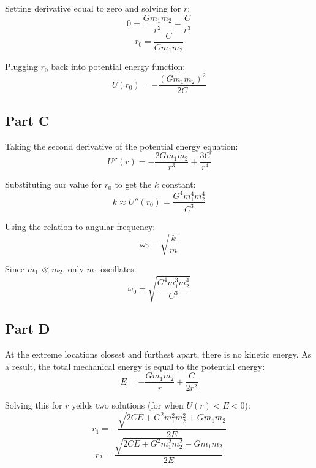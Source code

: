 \documentclass{article}
\begin{document}
Setting derivative equal to zero and solving for $r$:
$$ 0 = \frac{ G m_{1} m_{2} }{ r^{2} } - \frac{ C }{ r^{3} }  $$
$$ r_{0} = \frac{ C }{ G m_{1} m_{2} } $$

Plugging $r_{0}$ back into potential energy function:
$$ U( r_{0} ) = -\frac{ ( G m_{1} m_{2} )^{2} }{ 2 C } $$

\subsection*{ Part C }

Taking the second derivative of the potential energy equation:
$$ U''( r ) = -\frac{ 2 G m_{1} m_{2} }{ r^{3} } + \frac{ 3 C }{ r^{4} } $$

Substituting our value for $r_{0}$ to get the $k$ constant:
$$ k \approx U''( r_{0} ) = \frac{ G^{4} m_{1}^{4} m_{2}^{4} }{ C^{3} } $$

Using the relation to angular frequency:
$$ \omega_{0} = \sqrt{  \frac{ k }{ m } } $$

Since $m_{1} \ll m_{2}$, only $m_{1}$ oscillates:
$$ \omega_{0} = \sqrt{ \frac{ G^{4} m_{1}^{3} m_{2}^{4} }{ C^{3} } } $$

\subsection*{ Part D }

At the extreme locations closest and furthest apart, there is no kinetic energy.
As a result, the total mechanical energy is equal to the potential energy:
$$ E = -\frac{ G m_{1} m_{2} }{ r } + \frac{ C }{ 2 r^{2} } $$

Solving this for $r$ yeilds two solutions (for when $U( r ) < E < 0$):
$$ r_{1} = - \frac{ \sqrt{ 2 C E + G^{2} m_{1}^{2} m_{2}^{2} } + G m_{1} m_{2}
}{ 2 E } $$
$$ r_{2} = \frac{ \sqrt{ 2 C E + G^{2} m_{1}^{2} m_{2}^{2} } - G m_{1} m_{2}
}{ 2 E } $$
\end{document}
